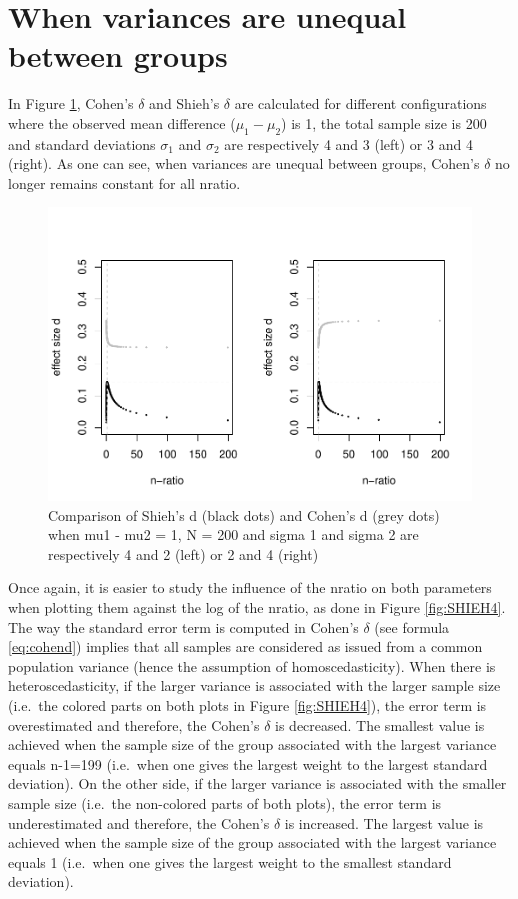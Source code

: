 \documentclass[man]{apa6}
\begin{document}
\hypertarget{when-variances-are-unequal-between-groups}{%
\section{When variances are unequal between groups}\label{when-variances-are-unequal-between-groups}}

In Figure \ref{fig:SHIEH3}, Cohen's \(\delta\) and Shieh's \(\delta\) are calculated for different configurations where the observed mean difference (\(\mu_{1}-\mu_{2}\)) is 1, the total sample size is 200 and standard deviations \(\sigma_{1}\) and \(\sigma_{2}\) are respectively 4 and 3 (left) or 3 and 4 (right). As one can see, when variances are unequal between groups, Cohen's \(\delta\) no longer remains constant for all nratio.

\begin{figure}
\centering
\includegraphics{Appendix1_files/figure-latex/SHIEH3-1.pdf}
\caption{\label{fig:SHIEH3}Comparison of Shieh's d (black dots) and Cohen's d (grey dots) when mu1 - mu2 = 1, N = 200 and sigma 1 and sigma 2 are respectively 4 and 2 (left) or 2 and 4 (right)}
\end{figure}

Once again, it is easier to study the influence of the nratio on both parameters when plotting them against the log of the nratio, as done in Figure \ref{fig:SHIEH4}.
The way the standard error term is computed in Cohen's \(\delta\) (see formula \ref{eq:cohend}) implies that all samples are considered as issued from a common population variance (hence the assumption of homoscedasticity). When there is heteroscedasticity, if the larger variance is associated with the larger sample size (i.e.~the colored parts on both plots in Figure \ref{fig:SHIEH4}), the error term is overestimated and therefore, the Cohen's \(\delta\) is decreased. The smallest value is achieved when the sample size of the group associated with the largest variance equals n-1=199 (i.e.~when one gives the largest weight to the largest standard deviation). On the other side, if the larger variance is associated with the smaller sample size (i.e.~the non-colored parts of both plots), the error term is underestimated and therefore, the Cohen's \(\delta\) is increased. The largest value is achieved when the sample size of the group associated with the largest variance equals 1 (i.e.~when one gives the largest weight to the smallest standard deviation).
\end{document}
